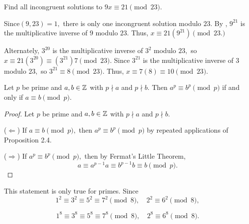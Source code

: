 \documentclass{../ximera}
\begin{document}
\begin{example}
 Find all incongruent solutions to $9x\equiv 21\pmod{23}$.
 
Since$(9,23)=1,$ there is only one  incongruent solution  modulo $23.$ By , $9^{21}$ is the multiplicative inverse of $9$ modulo ${23}$. Thus, $x\equiv 21(9^{21})\pmod{23.}$

Alternately, $3^{20}$ is the multiplicative inverse of $3^2$ modulo ${23},$ so $x\equiv 21(3^{20})\equiv  (3^{21})7\pmod{23}.$ Since $3^{21}$ is the multiplicative inverse of $3$ modulo $23,$ so $3^{21}\equiv 8\pmod{23}.$ Thus, $x\equiv 7(8)\equiv 10\pmod{23}.$
\end{example}

\begin{example}
 Let $p$ be prime and $a,b\in\mathbb Z$ with $p\nmid a$ and $p\nmid b.$ Then $a^p\equiv b^p\pmod{p}$ if and only if $a\equiv b\pmod{p}$.
 
 
\begin{proof}
  Let $p$ be prime and $a,b\in\mathbb Z$ with $p\nmid a$ and $p\nmid b.$ 
  
  ($\Leftarrow$) If $a\equiv  b\pmod{p},$ then $a^p\equiv b^p\pmod{p}$ by repeated applications of Proposition 2.4.
  
  ($\Rightarrow$)  If $a^p\equiv  b^p\pmod{p},$ then by Fermat's Little Theorem, 
  \[a\equiv a^{p-1}a\equiv b^{p-1}b\equiv b\pmod p. \]
\end{proof}
\begin{warning}
 This statement is only true for primes. Since
\[
 1^2\equiv 3^2\equiv 5^2\equiv 7^2\pmod{8},\quad 2^2\equiv 6^2\pmod{8},
 \]
 
\[
 1^8\equiv 3^8\equiv 5^8\equiv 7^8\pmod{8},\quad  2^8\equiv 6^8\pmod{8}.
\]
\end{warning}
\end{example}

\end{document}

